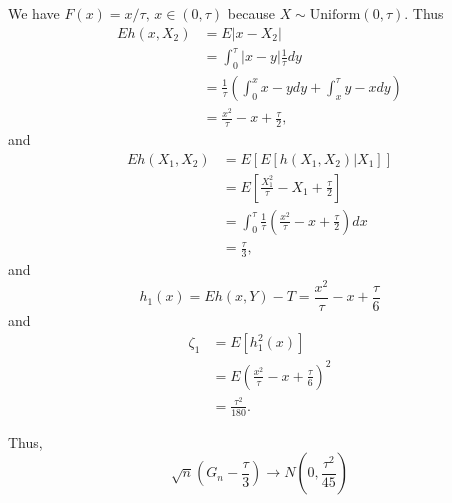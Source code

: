 \begin{solution}
    We have $F(x)=x/\tau, \, x\in (0,\tau)$ because $X\sim \text{Uniform}(0,\tau)$. 
    Thus
    \begin{equation*}
        \begin{split} E h(x, X_2) &=E|x-X_2| \\ 
            &=\int_{0}^{\tau}|x-y| \frac{1}{\tau} d y \\ 
            &=\frac{1}{\tau}\left(\int_{0}^{x} x-y d y+\int_{x}^{\tau} y-x d y\right) \\ 
            &=\frac{x^{2}}{\tau}-x+\frac{\tau}{2} ,
        \end{split}
    \end{equation*}
    and
    \begin{equation*}
        \begin{split} 
            E h(X_1, X_2)
            &=E[E[h(X_1, X_2) | X_1]] \\ 
            &=E\left[\frac{X_1^{2}}{\tau}-X_1+\frac{\tau}{2}\right] \\ 
            &=\int_{0}^{\tau} \frac{1}{\tau}\left(\frac{x^{2}}{\tau}-x+\frac{\tau}{2}\right) d x \\ 
            &=\frac{\tau}{3} ,
        \end{split}
    \end{equation*}
    and
    \begin{equation*}
        h_{1}(x) = E h(x, Y)-T=\frac{x^{2}}{\tau}-x+\frac{\tau}{6}
    \end{equation*}
    and 
    \begin{equation*}
        \begin{split} 
            \zeta_{1} &=E\left[h_{1}^{2}(x)\right] \\
            &=E\left(\frac{x^{2}}{\tau}-x+\frac{\tau}{6}\right)^{2} \\ 
            &=\frac{\tau^{2}}{180}.
        \end{split}
    \end{equation*}   

    Thus,
    \begin{equation*}
        \sqrt{n}\left(G_{n}-\frac{\tau}{3}\right) \rightarrow N\left(0, \frac{\tau^{2}}{45}\right)
    \end{equation*}
\end{solution}